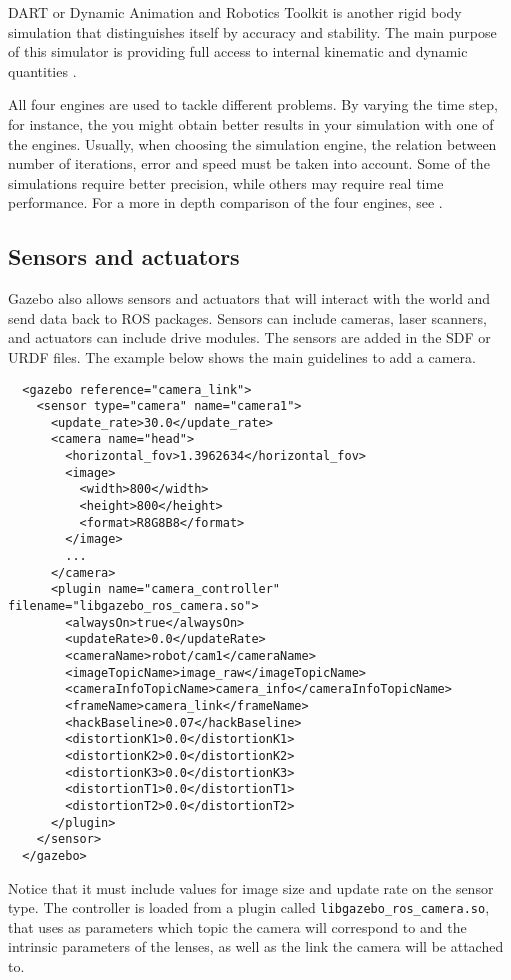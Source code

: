DART or Dynamic Animation and Robotics Toolkit is another rigid body simulation that distinguishes itself by accuracy and stability. The main purpose of this simulator is providing full access to internal kinematic and dynamic quantities \cite{lee2018dart}.

All four engines are used to tackle different problems. By varying the time step, for instance, the you might obtain better results in your simulation with one of the engines. Usually, when choosing the simulation engine, the relation between number of iterations, error and speed must be taken into account. Some of the simulations require better precision, while others may require real time performance. For a more in depth comparison of the four engines, see \cite{peters2014comparison}.

\subsection{Sensors and actuators}

Gazebo also allows sensors and actuators that will interact with the world and send data back to ROS packages. Sensors can include cameras, laser scanners, and actuators can include drive modules. The sensors are added in the SDF or URDF files. The example below shows the main guidelines to add a camera.

\begin{lstlisting}
  <gazebo reference="camera_link">
    <sensor type="camera" name="camera1">
      <update_rate>30.0</update_rate>
      <camera name="head">
        <horizontal_fov>1.3962634</horizontal_fov>
        <image>
          <width>800</width>
          <height>800</height>
          <format>R8G8B8</format>
        </image>
        ...
      </camera>
      <plugin name="camera_controller" filename="libgazebo_ros_camera.so">
        <alwaysOn>true</alwaysOn>
        <updateRate>0.0</updateRate>
        <cameraName>robot/cam1</cameraName>
        <imageTopicName>image_raw</imageTopicName>
        <cameraInfoTopicName>camera_info</cameraInfoTopicName>
        <frameName>camera_link</frameName>
        <hackBaseline>0.07</hackBaseline>
        <distortionK1>0.0</distortionK1>
        <distortionK2>0.0</distortionK2>
        <distortionK3>0.0</distortionK3>
        <distortionT1>0.0</distortionT1>
        <distortionT2>0.0</distortionT2>
      </plugin>
    </sensor>
  </gazebo>
\end{lstlisting}

Notice that it must include values for image size and update rate on the sensor type. The controller is loaded from a plugin called \texttt{libgazebo\_ros\_camera.so}, that uses as parameters which topic the camera will correspond to and the intrinsic parameters of the lenses, as well as the link the camera will be attached to.

